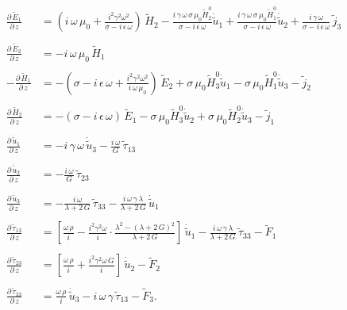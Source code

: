 \begin{align}
\frac{\partial\,\tilde{E}_1}{\partial\,z}&=\left(i\,\omega\,\mu_0+\frac{i^2\gamma^2\omega^2}{\sigma-i\,\epsilon\,\omega}\right)\,\tilde{H}_2-\frac{i\,\gamma\,\omega\,\sigma\,\mu_0\tilde{H}_2^0}{\sigma-i\,\epsilon\,\omega}\dot{\tilde{u}}_1+\frac{i\,\gamma\,\omega\,\sigma\,\mu_0\tilde{H}_1^0}{\sigma-i\,\epsilon\,\omega}\dot{\tilde{u}}_2+\frac{i\,\gamma\,\omega}{\sigma-i\,\epsilon\,\omega}\,\tilde{j}_3\\\nonumber\\\label{eq.edo_2}
\frac{\partial\,\tilde{E}_2}{\partial\,z}&=-i\,\omega\,\mu_0\,\tilde{H}_1\\\nonumber\\\label{eq.edo_3}
-\frac{\partial\,\tilde{H}_1}{\partial\,z}&=-\left(\sigma-i\,\epsilon\,\omega+\frac{i^2\gamma^2\omega^2}{i\,\omega\,\mu_0}\right)\,\tilde{E}_2+\sigma\,\mu_0\tilde{H}_3^0\dot{\tilde{u}}_1-\sigma\,\mu_0\tilde{H}_1^0\dot{\tilde{u}}_3-\tilde{j}_2\\\nonumber\\
\frac{\partial\,\tilde{H}_2}{\partial\,z}&=-\left(\sigma-i\,\epsilon\,\omega\right)\,\tilde{E}_1-\sigma\,\mu_0\tilde{H}_3^0\dot{\tilde{u}}_2+\sigma\,\mu_0\tilde{H}_2^0\dot{\tilde{u}}_3-\tilde{j}_1\\\nonumber\\\label{eq.edo_5}
\frac{\partial\,\dot{\tilde{u}}_1}{\partial\,z}&=-i\,\gamma\,\omega\,\dot{\tilde{u}}_3-\frac{i\,\omega}{G}\,\tilde{\tau}_{13}\\\nonumber\\
\frac{\partial\,\dot{\tilde{u}}_2}{\partial\,z}&=-\frac{i\,\omega}{G}\,\tilde{\tau}_{23}\\\nonumber\\\label{eq.edo_7}
\frac{\partial\,\dot{\tilde{u}}_3}{\partial\,z}&=-\frac{i\,\omega}{\lambda+2\,G}\,\tilde{\tau}_{33}-\frac{i\,\omega\,\gamma\,\lambda}{\lambda+2\,G}\,\dot{\tilde{u}}_1\\\nonumber\\
\frac{\partial\,\tilde{\tau}_{13}}{\partial\,z}&=
\left[\frac{\omega\,\rho}{i}-\frac{i^2\gamma^2\omega}{i}\cdot\frac{\lambda^2-(\lambda+2\,G)^2}{\lambda+2\,G}\right]\,\dot{\tilde{u}}_1-\frac{i\,\omega\,\gamma\,\lambda}{\lambda+2\,G}\,\tilde{\tau}_{33}-\tilde{F}_1\\\nonumber\\
\frac{\partial\,\tilde{\tau}_{23}}{\partial\,z}&=\left[\frac{\omega\,\rho}{i}+\frac{i^2\gamma^2\omega\,G}{i}\right]\,\dot{\tilde{u}}_2-\tilde{F}_2\\\nonumber\\\label{eq.edo_10}
\frac{\partial\,\tilde{\tau}_{33}}{\partial\,z}&=\frac{\omega\,\rho}{i}\,\dot{\tilde{u}}_3-i\,\omega\,\gamma\,\tilde{\tau}_{13}-\tilde{F}_3.
\end{align}

